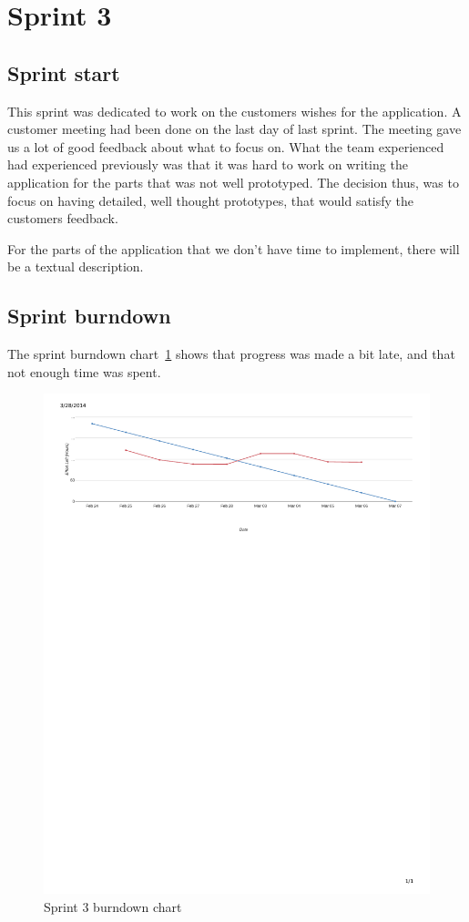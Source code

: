 \section{Sprint 3}
\subsection{Sprint start}
This sprint was dedicated to work on the customers wishes for the application. A customer meeting had been done on the last day of last sprint. The meeting gave us a lot of good feedback about what to focus on.
What the team experienced had experienced previously was that it was hard to work on writing the application for the parts that was not well prototyped.
The decision thus, was to focus on having detailed, well thought prototypes, that would satisfy the customers feedback. 

For the parts of the application that we don't have time to implement, there will be a textual description.

\subsection{Sprint burndown}

The sprint burndown chart~\ref{fig:sprint3burndown} shows that progress was made a bit late, and that not enough time was spent.

\begin{figure}[H]
\includegraphics[width=\textwidth, trim= 1cm 21cm 1cm 1cm, clip=true]{ch/projectManagement/fig/burndown3.pdf}
\caption{Sprint 3 burndown chart}
\label{fig:sprint3burndown}
\end{figure}

